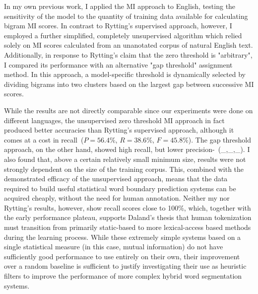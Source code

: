 In my own previous work\cite{kearsley14}, I applied the MI approach to English, testing the sensitivity of the model to the quantity of training data available for calculating bigram MI scores. In contrast to Rytting's supervised approach, however, I employed a further simplified, completely unsupervised algorithm which relied solely on MI scores calculated from an unanotated corpus of natural English text. Additionally, in response to Rytting's claim that the zero threshold is "arbitrary", I compared its performance with an alternative "gap threshold" assignment method. In this approach, a model-specific threshold is dynamically selected by dividing bigrams into two clusters based on the largest gap between successive MI scores.

While the results are not directly comparable since our experiments were done on different languages, the unsupervised zero threshold MI approach in fact produced better accuracies than Rytting's supervised approach\cite{rytting04}, although it comes at a cost in recall\textemdash~($P = 56.4\%$, $R = 38.6\%$, $F = 45.8\%$). The gap threshold approach, on the other hand, showed high recall, but lower precision-\textemdash~(\_,\_,\_). I also found that, above a certain relatively small minimum size, results were not strongly dependent on the size of the training corpus. This, combined with the demonstrated efficacy of the unsupervised approach, means that the data required to build useful statistical word boundary prediction systems can be acquired cheaply, without the need for human annotation. Neither my nor Rytting's results, however, show recall scores close to 100\%, which, together with the early performance plateau, supports Daland's thesis that human tokenization must transition from primarily static-based to more lexical-access based methods during the learning process. While these extremely simple systems based on a single statistical measure (in this case, mutual information) do not have sufficiently good performance to use entirely on their own, their improvement over a random baseline is sufficient to justify investigating their use as heuristic filters to improve the performance of more complex hybrid word segmentation systems\cite{kearsley14}.

